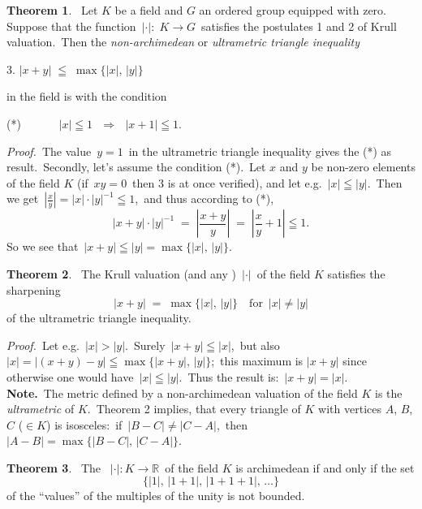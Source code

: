 \documentclass[12pt]{article}
\theoremstyle{definition}
\newtheorem{thmplain}{Theorem}
\begin{document}
\begin{thmplain}
 \, Let $K$ be a field and $G$ an ordered group equipped with zero.\, Suppose that the function \,$|\cdot|\!:\; K\to G$\, satisfies the postulates 1 and 2 of Krull valuation.\, Then the {\em non-archimedean} or {\em ultrametric triangle inequality}

3. \quad\quad\quad\quad $|x\!+\!y| \;\leqq\; \max\{|x|,\,|y|\}$

in the field is  with the condition

(*) $\quad\quad\quad |x|\leqq 1 \,\,\,\, \Rightarrow \,\,\,\, |x\!+\!1|\leqq 1.$
\end{thmplain}

{\em Proof.}\, The value \,$y = 1$\, in the ultrametric triangle inequality gives the (*) as result.\, Secondly, let's assume the condition (*).\, Let $x$ and $y$ be non-zero elements of the field $K$ (if\, $xy =0$\, then 3 is at once verified), and let e.g.\, $|x| \leqq |y|$.\, Then we get\, 
$\displaystyle|\frac{x}{y}| = |x|\cdot|y|^{-1}\leqq 1$,\, and thus according to (*),
      $$|x\!+\!y|\cdot|y|^{-1} \;=\; \left|\frac{x\!+\!y}{y}\right| \;=\;
 \left|\frac{x}{y}+1\right|\leqq 1.$$ 
So we see that\, $|x\!+\!y|\leqq |y| = \max\{|x|,\,|y|\}$.\\

\begin{thmplain}
 \, The Krull valuation (and any )\, $|\cdot|$\, of the field $K$ satisfies the sharpening
    $$|x\!+\!y| \;=\; \max\{|x|,\,|y|\}\quad\mathrm{for}\,\,\,|x| \neq |y|$$
of the ultrametric triangle inequality.
\end{thmplain}

{\em Proof.}\, Let e.g.\, $|x| > |y|$.\, Surely\, $|x\!+\!y| \leqq |x|$,\, but also\, $|x| = |(x\!+\!y)\!-\!y| \leqq \max\{|x\!+\!y|,\,|y|\}$;\, this maximum is $|x\!+\!y|$ since otherwise one would have\, $|x| \leqq |y|$.\, Thus the result is:\, $|x\!+\!y| = |x|$.\\

\textbf{Note.}\, The metric defined by a non-archimedean valuation of the field $K$ is the {\em ultrametric} of $K$.\, Theorem 2 implies, that every triangle of $K$ with vertices $A$, $B$, $C$ ($\in K$) is isosceles:\, if\, $|B\!-\!C| \neq |C\!-\!A|$,\, then\, $|A\!-\!B| = \max\{|B\!-\!C|,\,|C\!-\!A|\}$.\\

\begin{thmplain}
 \, The \, $|\cdot|: K\to \mathbb{R}$\, of the field $K$ is archimedean if and only if the set          
      $$\{|1|,\,|1\!+\!1|,\,|1\!+\!1\!+\!1|,\,\ldots\}$$
of the ``values'' of the multiples of the unity is not bounded.
\end{thmplain}
\end{document}
